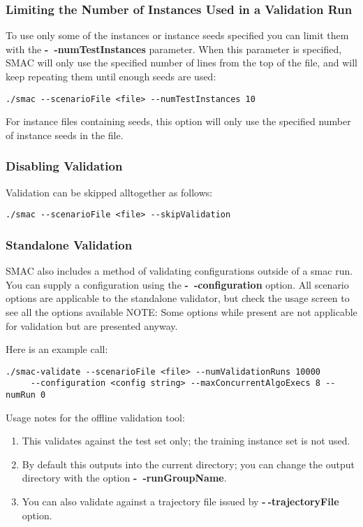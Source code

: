 \subsubsection{Limiting the Number of Instances Used in a Validation Run}

To use only some of the instances or instance seeds specified you can limit them with the \textbf{-~$\!$-numTestInstances} parameter. When this parameter is specified, SMAC will only use the specified number of lines from the top of the file, and will keep repeating them until enough seeds are used: 
\begin{verbatim}
./smac --scenarioFile <file> --numTestInstances 10
\end{verbatim}
For instance files containing seeds, this option will only use the specified number of instance seeds in the file.

\subsubsection{Disabling Validation}
Validation can be skipped alltogether as follows:
\begin{verbatim}
./smac --scenarioFile <file> --skipValidation
\end{verbatim}

\subsubsection{Standalone Validation}
SMAC also includes a method of validating configurations outside of a smac run.
You can supply a configuration using the \textbf{-~$\!$-configuration} option. All scenario options are applicable to the standalone validator, but check the usage screen to see all the options available \textsc{NOTE:} Some options while present are not applicable for validation but are presented anyway.

Here is an example call:
\begin{verbatim}
./smac-validate --scenarioFile <file> --numValidationRuns 10000 
     --configuration <config string> --maxConcurrentAlgoExecs 8 --numRun 0
\end{verbatim}
%
Usage notes for the offline validation tool:
\begin{enumerate}
\item This validates against the test set only; the training instance set is not used.
\item By default this outputs into the current directory; you can change the output directory with the option \textbf{-~$\!$-runGroupName}.
\item You can also validate against a trajectory file issued by \textbf{-$~\!$-trajectoryFile} option. 


\end{enumerate}


